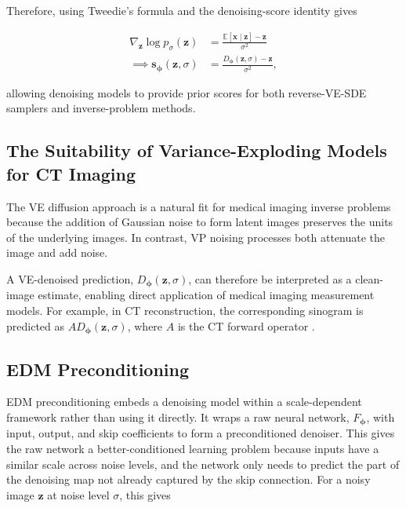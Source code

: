 Therefore, using Tweedie's formula and the denoising-score identity \cite{efron_tweedies_2011,vincent_connection_2011} gives

\begin{align}
\nabla_{\mathbf{z}}\log p_\sigma(\mathbf{z})&=
\frac{\mathbb E[\mathbf{x}\mid \mathbf{z}]-\mathbf{z}}{\sigma^2}\\
\implies \mathbf{s}_{\boldsymbol{\phi}}(\mathbf{z},\sigma)&=
\frac{D_{\boldsymbol{\phi}}(\mathbf{z},\sigma)-\mathbf{z}}{\sigma^2},
\label{eq:score_from_denoiser}
\end{align}

allowing denoising models to provide prior scores for both reverse-VE-SDE samplers and inverse-problem methods.

\subsection{The Suitability of Variance-Exploding Models for CT Imaging}
\label{subsec:suitability_ve_ct}

The VE diffusion approach is a natural fit for medical imaging inverse problems because the addition of Gaussian noise to form latent images preserves the units of the underlying images. In contrast, VP noising processes both attenuate the image and add noise.

A VE-denoised prediction, $D_{\boldsymbol{\phi}}(\mathbf{z},\sigma)$, can therefore be interpreted as a clean-image estimate, enabling direct application of medical imaging measurement models. For example, in CT reconstruction, the corresponding sinogram is predicted as $AD_{\boldsymbol{\phi}}(\mathbf{z},\sigma)$, where $A$ is the CT forward operator \cite{song_solving_2021,chung_score-based_2022,chung_diffusion_2022}.

\subsection{EDM Preconditioning} \label{subsec:edm_preconditioning}

EDM preconditioning \cite{karras_elucidating_2022-1} embeds a denoising model within a scale-dependent framework rather than using it directly. It wraps a raw neural network, $F_{\boldsymbol{\phi}}$, with input, output, and skip coefficients to form a preconditioned denoiser. This gives the raw network a better-conditioned learning problem because inputs have a similar scale across noise levels, and the network only needs to predict the part of the denoising map not already captured by the skip connection. For a noisy image $\mathbf{z}$ at noise level $\sigma$, this gives


